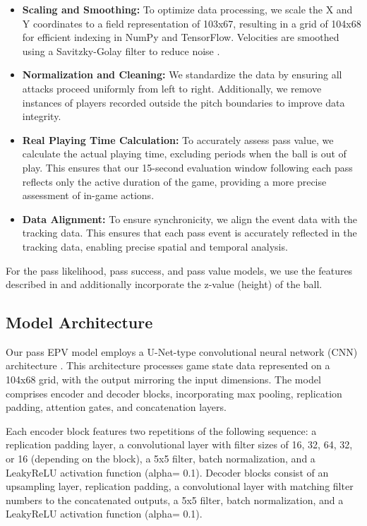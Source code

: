 \begin{itemize}
    \item \textbf{Scaling and Smoothing:} To optimize data processing, we scale the X and Y coordinates to a field representation of 103x67, resulting in a grid of 104x68 for efficient indexing in NumPy and TensorFlow. Velocities are smoothed using a Savitzky-Golay filter to reduce noise \citep{shaw_2020}.

    \item \textbf{Normalization and Cleaning:}  We standardize the data by ensuring all attacks proceed uniformly from left to right. Additionally, we remove instances of players recorded outside the pitch boundaries to improve data integrity.

    \item \textbf{Real Playing Time Calculation:} To accurately assess pass value, we calculate the actual playing time, excluding periods when the ball is out of play. This ensures that our 15-second evaluation window following each pass reflects only the active duration of the game, providing a more precise assessment of in-game actions.

    \item \textbf{Data Alignment:}  To ensure synchronicity, we align the event data with the tracking data. This ensures that each pass event is accurately reflected in the tracking data, enabling precise spatial and temporal analysis.
\end{itemize}

For the pass likelihood, pass success, and pass value models, we use the features described in \cite{Fernández2021} and additionally incorporate the z-value (height) of the ball.

\subsection{Model Architecture} \label{model_architecture_and_selection}

Our pass EPV model employs a U-Net-type convolutional neural network (CNN) architecture \citep{ronneberger2015unet}. This architecture processes game state data represented on a 104x68 grid, with the output mirroring the input dimensions.  The model comprises encoder and decoder blocks, incorporating max pooling, replication padding, attention gates, and concatenation layers.

Each encoder block features two repetitions of the following sequence: a replication padding layer, a convolutional layer with filter sizes of 16, 32, 64, 32, or 16 (depending on the block), a 5x5 filter, batch normalization, and a LeakyReLU activation function (alpha= 0.1). Decoder blocks consist of an upsampling layer, replication padding, a convolutional layer with matching filter numbers to the concatenated outputs, a 5x5 filter, batch normalization, and a LeakyReLU activation function (alpha= 0.1).

